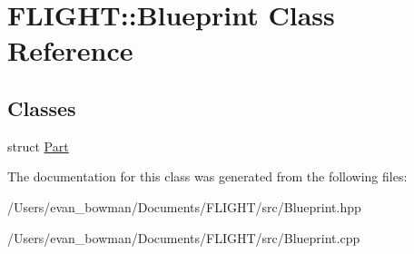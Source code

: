 \hypertarget{class_f_l_i_g_h_t_1_1_blueprint}{}\section{F\+L\+I\+G\+HT\+:\+:Blueprint Class Reference}
\label{class_f_l_i_g_h_t_1_1_blueprint}
\subsection*{Classes}
\begin{DoxyCompactItemize}
\item 
struct \hyperlink{struct_f_l_i_g_h_t_1_1_blueprint_1_1_part}{Part}
\end{DoxyCompactItemize}


The documentation for this class was generated from the following files\+:\begin{DoxyCompactItemize}
\item 
/\+Users/evan\+\_\+bowman/\+Documents/\+F\+L\+I\+G\+H\+T/src/Blueprint.\+hpp\item 
/\+Users/evan\+\_\+bowman/\+Documents/\+F\+L\+I\+G\+H\+T/src/Blueprint.\+cpp\end{DoxyCompactItemize}
